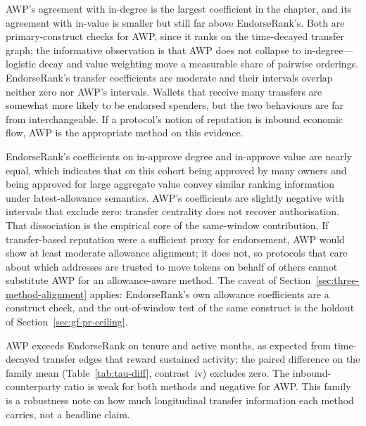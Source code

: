 


AWP's agreement with in-degree is the largest coefficient in the chapter, and its agreement with in-value is smaller but still far above EndorseRank's. Both are primary-construct checks for AWP, since it ranks on the time-decayed transfer graph; the informative observation is that AWP does not collapse to in-degree---logistic decay and value weighting move a measurable share of pairwise orderings. EndorseRank's transfer coefficients are moderate and their intervals overlap neither zero nor AWP's intervals. Wallets that receive many transfers are somewhat more likely to be endorsed spenders, but the two behaviours are far from interchangeable. If a protocol's notion of reputation is inbound economic flow, AWP is the appropriate method on this evidence.




EndorseRank's coefficients on in-approve degree and in-approve value are nearly equal, which indicates that on this cohort being approved by many owners and being approved for large aggregate value convey similar ranking information under latest-allowance semantics. AWP's coefficients are slightly negative with intervals that exclude zero: transfer centrality does not recover authorisation. That dissociation is the empirical core of the same-window contribution. If transfer-based reputation were a sufficient proxy for endorsement, AWP would show at least moderate allowance alignment; it does not, so protocols that care about which addresses are trusted to move tokens on behalf of others cannot substitute AWP for an allowance-aware method. The caveat of Section~\ref{sec:three-method-alignment} applies: EndorseRank's own allowance coefficients are a construct check, and the out-of-window test of the same construct is the holdout of Section~\ref{sec:gf-pr-ceiling}.




AWP exceeds EndorseRank on tenure and active months, as expected from time-decayed transfer edges that reward sustained activity; the paired difference on the family mean (Table~\ref{tab:tau-diff}, contrast~iv) excludes zero. The inbound-counterparty ratio is weak for both methods and negative for AWP. This family is a robustness note on how much longitudinal transfer information each method carries, not a headline claim.

